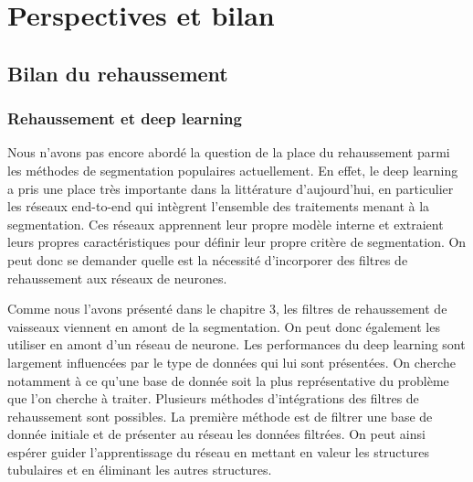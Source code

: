 \chapter{Perspectives et bilan}


\section{Bilan du rehaussement}

\subsection{Rehaussement et deep learning}

Nous n'avons pas encore abordé la question de la place du rehaussement parmi les méthodes de segmentation populaires actuellement. En effet, le deep learning a pris une place très importante dans la littérature d'aujourd'hui, en particulier les réseaux end-to-end qui intègrent l'ensemble des traitements menant à la segmentation. Ces réseaux apprennent leur propre modèle interne et extraient leurs propres caractéristiques pour définir leur propre critère de segmentation. On peut donc se demander quelle est la nécessité d'incorporer des filtres de rehaussement aux réseaux de neurones.

Comme nous l'avons présenté dans le chapitre 3, les filtres de rehaussement de vaisseaux viennent en amont de la segmentation. On peut donc également les utiliser en amont d'un réseau de neurone. Les performances du deep learning sont largement influencées par le type de données qui lui sont présentées. On cherche notamment à ce qu'une base de donnée soit la plus représentative du problème que l'on cherche à traiter. Plusieurs méthodes d'intégrations des filtres de rehaussement sont possibles. La première méthode est de filtrer une base de donnée initiale et de présenter au réseau les données filtrées. On peut ainsi espérer guider l'apprentissage du réseau en mettant en valeur les structures tubulaires et en éliminant les autres structures.

